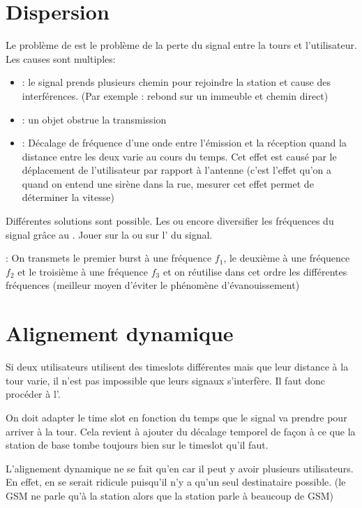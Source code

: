 \newpage
\section{Dispersion}

Le problème de  est le problème de la perte du signal entre la tours et l'utilisateur. Les causes sont multiples:
\begin{itemize}
  \item {}: le signal prends plusieurs chemin pour rejoindre la station et cause des interférences. (Par exemple : rebond sur un immeuble et chemin direct)
  \item {}: un objet obstrue la transmission
  \item {}: Décalage de fréquence d'une onde entre l'émission et la réception quand la distance entre les deux varie au cours du temps. Cet effet est causé par le déplacement de l'utilisateur par rapport à l'antenne (c'est l'effet qu'on a quand on entend une sirène dans la rue, mesurer cet effet permet de déterminer la vitesse)
\end{itemize}

Différentes solutions sont possible. Les  ou encore diversifier les fréquences du signal grâce au . Jouer sur la  ou sur l' du signal.

 : On transmets le premier burst à une fréquence $f_1$, le deuxième à une fréquence $f_2$ et le troisième à une fréquence $f_3$ et on réutilise dans cet ordre les différentes fréquences (meilleur moyen d'éviter le phénomène d'évanouissement)

\section{Alignement dynamique}

Si deux utilisateurs utilisent des timeslots différentes mais que leur distance à la tour varie, il n'est pas impossible que leurs signaux s'interfère. Il faut donc procéder à l'.

On doit adapter le time slot en fonction du temps que le signal va prendre pour arriver à la tour. Cela revient à ajouter du décalage temporel de façon à ce que la station de base tombe toujours
bien sur le timeslot qu'il faut.

L'alignement dynamique ne se fait qu'en  car il peut y avoir plusieurs utilisateurs.
En effet, en  se serait ridicule puisqu'il n'y a qu'un seul destinataire possible. (le GSM ne parle qu'à la station alors que la station parle à beaucoup de GSM)

